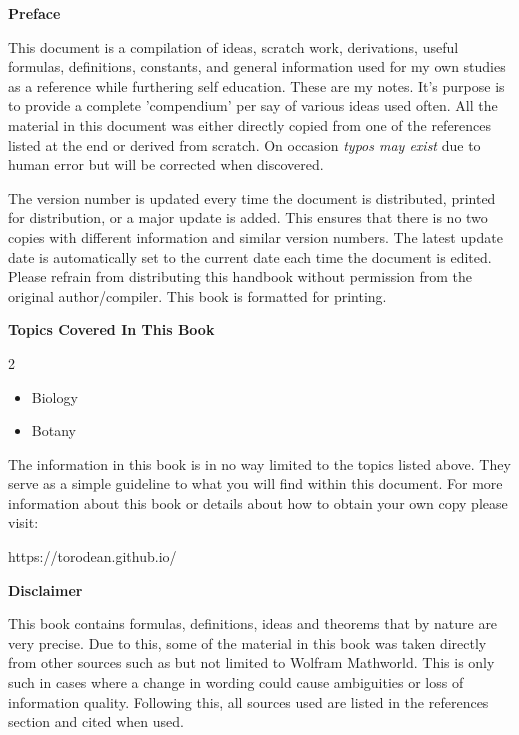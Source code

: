 \begin{center}
	\textbf{Preface}
\end{center}

This document is a compilation of ideas, scratch work, derivations, useful formulas, definitions, constants, and general information used for my own studies as a reference while furthering self education. These are my notes. It's purpose is to provide a complete 'compendium' per say of various ideas used often. All the material in this document was either directly copied from one of the references listed at the end or derived from scratch. On occasion \textit{typos may exist} due to human error but will be corrected when discovered.
	
The version number is updated every time the document is distributed, printed for distribution, or a major update is added. This ensures that there is no two copies with different information and similar version numbers. The latest update date is automatically set to the current date each time the document is edited. Please refrain from distributing this handbook without permission from the original author/compiler. This book is formatted for printing.

\begin{center}
	\textbf{Topics Covered In This Book}
\end{center}

\begin{multicols}{2}
\begin{itemize}
	\item Biology
	\item Botany
\end{itemize} 
\end{multicols}

The information in this book is in no way limited to the topics listed above. They serve as a simple guideline to what you will find within this document. For more information about this book or details about how to obtain your own copy please visit:
\begin{center}
	https://torodean.github.io/
\end{center}

\begin{center}
	\textbf{Disclaimer}
\end{center}

This book contains formulas, definitions, ideas and theorems that by nature are very precise. Due to this, some of the material in this book was taken directly from other sources such as but not limited to Wolfram Mathworld. This is only such in cases where a change in wording could cause ambiguities or loss of information quality.  Following this, all sources used are listed in the references section and cited when used.
